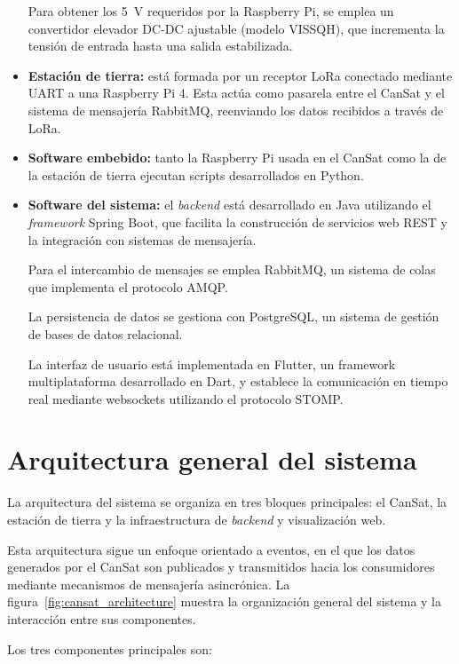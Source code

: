 \begin{itemize}
    Para obtener los 5~V requeridos por la Raspberry Pi, se emplea un convertidor elevador DC-DC ajustable (modelo VISSQH), que incrementa la tensión de entrada hasta una salida estabilizada.

    \item \textbf{Estación de tierra:} está formada por un receptor LoRa conectado mediante UART a una Raspberry Pi 4.
    Esta actúa como pasarela entre el CanSat y el sistema de mensajería RabbitMQ, reenviando los datos recibidos a través de LoRa.

    \item \textbf{Software embebido:} tanto la Raspberry Pi usada en el CanSat como la de la estación de tierra ejecutan scripts desarrollados en Python.

    \item \textbf{Software del sistema:} el \emph{backend} está desarrollado en Java utilizando el \emph{framework} Spring Boot, que facilita la construcción de servicios web REST y la integración con sistemas de mensajería.

    Para el intercambio de mensajes se emplea RabbitMQ, un sistema de colas que implementa el protocolo AMQP.

    La persistencia de datos se gestiona con PostgreSQL, un sistema de gestión de bases de datos relacional.

    La interfaz de usuario está implementada en Flutter, un framework multiplataforma desarrollado en Dart, y establece la comunicación en tiempo real mediante websockets utilizando el protocolo STOMP.
\end{itemize}


\section{Arquitectura general del sistema}
La arquitectura del sistema se organiza en tres bloques principales: el CanSat, la estación de tierra y la infraestructura de \emph{backend} y visualización web.

Esta arquitectura sigue un enfoque orientado a eventos, en el que los datos generados por el CanSat son publicados y transmitidos hacia los consumidores mediante mecanismos de mensajería asincrónica.
La figura~\ref{fig:cansat_architecture} muestra la organización general del sistema y la interacción entre sus componentes.

Los tres componentes principales son:

